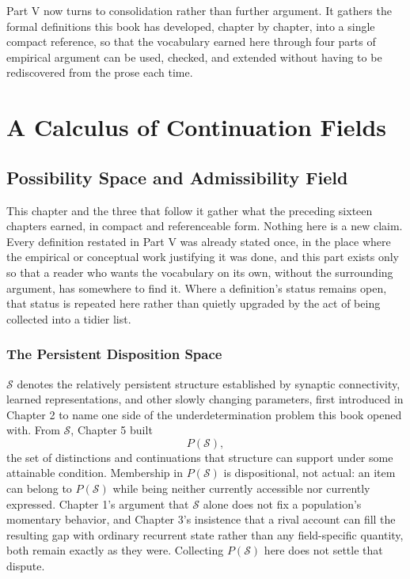\documentclass[11pt]{book}
\begin{document}
Part V now turns to consolidation rather than further argument. It gathers the formal definitions this book has developed, chapter by chapter, into a single compact reference, so that the vocabulary earned here through four parts of empirical argument can be used, checked, and extended without having to be rediscovered from the prose each time.

\part{A Calculus of Continuation Fields}

\chapter{Possibility Space and Admissibility Field}

This chapter and the three that follow it gather what the preceding sixteen chapters earned, in compact and referenceable form. Nothing here is a new claim. Every definition restated in Part V was already stated once, in the place where the empirical or conceptual work justifying it was done, and this part exists only so that a reader who wants the vocabulary on its own, without the surrounding argument, has somewhere to find it. Where a definition's status remains open, that status is repeated here rather than quietly upgraded by the act of being collected into a tidier list.

\section*{The Persistent Disposition Space}

$\mathcal S$ denotes the relatively persistent structure established by synaptic connectivity, learned representations, and other slowly changing parameters, first introduced in Chapter 2 to name one side of the underdetermination problem this book opened with. From $\mathcal S$, Chapter 5 built
\[
P(\mathcal S),
\]
the set of distinctions and continuations that structure can support under some attainable condition. Membership in $P(\mathcal S)$ is dispositional, not actual: an item can belong to $P(\mathcal S)$ while being neither currently accessible nor currently expressed. Chapter 1's argument that $\mathcal S$ alone does not fix a population's momentary behavior, and Chapter 3's insistence that a rival account can fill the resulting gap with ordinary recurrent state rather than any field-specific quantity, both remain exactly as they were. Collecting $P(\mathcal S)$ here does not settle that dispute.
\end{document}
